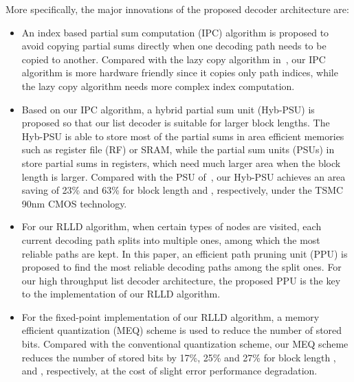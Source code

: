 \documentclass[journal]{IEEEtran}
\begin{document}
More specifically, the major innovations of the proposed decoder architecture are:
\begin{itemize}
\item An index based partial sum computation (IPC) algorithm is proposed to avoid copying partial sums directly when one decoding path needs to be copied to another. Compared with the lazy copy algorithm in~\cite{ido_it}, our IPC algorithm is more hardware friendly since it copies only path indices, while the lazy copy algorithm needs more complex index computation.
\item Based on our IPC algorithm, a hybrid partial sum unit (Hyb-PSU) is proposed so that our list decoder is suitable for larger block lengths. The Hyb-PSU is able to store most of the partial sums in area efficient memories such as register file (RF) or SRAM, while the partial sum units (PSUs) in~\cite{llr_list_tsp, jun_low_mem_list,tree_list_dec} store partial sums in registers, which need much larger area when the block length  is larger. Compared with the PSU of~\cite{jun_low_mem_list}, our Hyb-PSU achieves an area saving of 23\% and 63\% for block length  and , respectively, under the TSMC 90nm CMOS technology.
\item For our RLLD algorithm, when certain types of nodes are visited, each current decoding path splits into multiple ones, among which the  most reliable paths are kept. In this paper, an efficient path pruning unit (PPU) is proposed to find the  most reliable decoding paths among the split ones. For our high throughput list decoder architecture, the proposed PPU is the key to the implementation of our RLLD algorithm.
\item For the fixed-point implementation of our RLLD algorithm, a memory efficient quantization (MEQ) scheme is used to reduce the number of stored bits. Compared with the conventional quantization scheme, our MEQ scheme reduces the number of stored bits by 17\%, 25\% and 27\% for block length ,  and , respectively, at the cost of slight error performance degradation.
\end{itemize}
\end{document}
